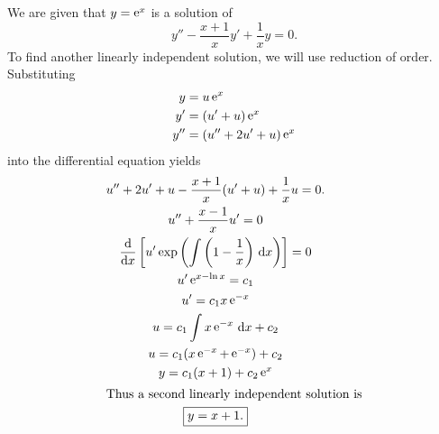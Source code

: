 {%
\begin{Solution}
  \label{solution y-x+1xy+1xy}
  We are given that $y = \mathop{\mathrm{e}}\nolimits^x$ is a solution of
  \[ 
  y'' - \frac{x + 1}{x} y' + \frac{1}{x} y = 0.
  \]
  To find another linearly independent solution, we will use reduction of 
  order.  Substituting 
  \begin{align*}
    y &= u \mathop{\mathrm{e}}\nolimits^x \\ 
    y' &= (u' + u)\mathop{\mathrm{e}}\nolimits^x \\
    y'' &= (u'' + 2u' + u)\mathop{\mathrm{e}}\nolimits^x
  \end{align*}
  into the differential equation yields
  \begin{gather*}
    u'' + 2u' + u - \frac{x+1}{x} (u' + u) + \frac{1}{x} u = 0. \\
    u'' + \frac{x-1}{x} u' = 0 \\
    \frac{\mathrm{d}}{\mathrm{d} x} \left[ u' \exp\left(\int \left(1 - \frac{1}{x}\right)\,\mathrm{d} x 
      \right) \right] = 0 \\
    u' \mathop{\mathrm{e}}\nolimits^{x - \ln x} = c_1 \\
    u' = c_1 x \mathop{\mathrm{e}}\nolimits^{-x} \\
    u = c_1 \int x \mathop{\mathrm{e}}\nolimits^{-x}\,\mathrm{d} x + c_2  \\
    u = c_1 (x \mathop{\mathrm{e}}\nolimits^{-x} + \mathop{\mathrm{e}}\nolimits^{-x}) + c_2  \\
    y = c_1 (x + 1) + c_2 \mathop{\mathrm{e}}\nolimits^x  \\
    \intertext{Thus a second linearly independent solution is}
    \boxed{ 
      y = x+1. 
      }
  \end{gather*}
\end{Solution}













}
